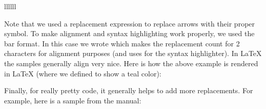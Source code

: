 \documentclass{book}
\begin{document}
\begin{mdDiv}[class={sample},elem={sample},margin-bottom={2ex},data-line={812}]
\begin{mdDiv}[class={sampleblock},elem={sampleblock},padding-left={1em},padding-right={1em},padding-top={-1ex},border-style={solid},border-width={1\cssPixel},line-adjust={0},data-line={813}]
\begin{mdPre}[class={para-block,pretty,pre-fenced,language-haskell,lang-haskell,haskell,highlighted},data-line={828},data-line-code={829},language={haskell}]
{\begin{mdCodeTable}[data-line={829}]{6}{llllll}
\end{mdCodeTable}
}%
\end{mdPre}%
\end{mdDiv}%
\end{mdDiv}%
\begin{mdP}[data-line={827}]%
{}Note that we used a replacement expression to replace arrows with their
proper symbol. To make alignment and syntax highlighting work properly,
we used the bar format. In this case we wrote %
{}\mdCode[class={code,code1}]{{\textbackslash}(-{\textgreater}{\textbar}}%
{} which makes the
replacement count for 2 characters for alignment purposes (and uses %
{}\mdCode[class={code,code1}]{-{\textgreater}}%
{}
for the syntax highlighter). In LaTeX the samples generally align very
nice. Here is how the above example is rendered in LaTeX (where
we defined %
{}%
{} to show a teal color):%
\end{mdP}%
\begin{mdP}[class={indent},data-line={835}]%
{}%
{}%
\end{mdP}%
\begin{mdP}[class={indent},data-line={837}]%
{}Finally, for really pretty code, it generally helps to add more 
replacements. For example, here is a sample from the%
{}{\mdNbsp}%
{} manual:%
\end{mdP}%
\end{document}
